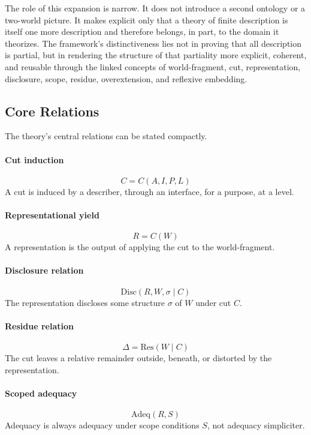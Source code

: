 \documentclass[11pt]{article}
\begin{document}
The role of this expansion is narrow. It does not introduce a second ontology or a two-world picture. It makes explicit only that a theory of finite description is itself one more description and therefore belongs, in part, to the domain it theorizes. The framework's distinctiveness lies not in proving that all description is partial, but in rendering the structure of that partiality more explicit, coherent, and reusable through the linked concepts of world-fragment, cut, representation, disclosure, scope, residue, overextension, and reflexive embedding.

\subsection{Core Relations}

The theory's central relations can be stated compactly.

\paragraph{Cut induction}
\[
C = C(A,I,P,L)
\]
A cut is induced by a describer, through an interface, for a purpose, at a level.

\paragraph{Representational yield}
\[
R = C(W)
\]
A representation is the output of applying the cut to the world-fragment.

\paragraph{Disclosure relation}
\[
\mathrm{Disc}(R,W,\sigma \mid C)
\]
The representation discloses some structure \(\sigma\) of \(W\) under cut \(C\).

\paragraph{Residue relation}
\[
\Delta = \mathrm{Res}(W \mid C)
\]
The cut leaves a relative remainder outside, beneath, or distorted by the representation.

\paragraph{Scoped adequacy}
\[
\mathrm{Adeq}(R,S)
\]
Adequacy is always adequacy under scope conditions \(S\), not adequacy simpliciter.
\end{document}
